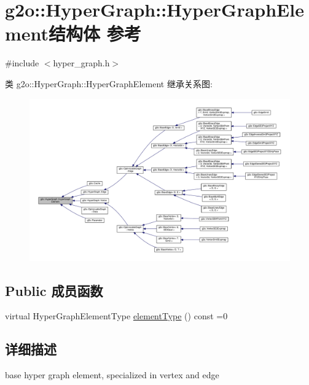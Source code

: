 \hypertarget{structg2o_1_1HyperGraph_1_1HyperGraphElement}{\section{g2o\-:\-:Hyper\-Graph\-:\-:Hyper\-Graph\-Element结构体 参考}
\label{structg2o_1_1HyperGraph_1_1HyperGraphElement}
}


{\ttfamily \#include $<$hyper\-\_\-graph.\-h$>$}



类 g2o\-:\-:Hyper\-Graph\-:\-:Hyper\-Graph\-Element 继承关系图\-:
\nopagebreak
\begin{figure}[H]
\begin{center}
\leavevmode
\includegraphics[width=350pt]{structg2o_1_1HyperGraph_1_1HyperGraphElement__inherit__graph}
\end{center}
\end{figure}
\subsection*{Public 成员函数}
\begin{DoxyCompactItemize}
\item 
virtual Hyper\-Graph\-Element\-Type \hyperlink{structg2o_1_1HyperGraph_1_1HyperGraphElement_a1a9d7b748698c09d202373e06e413ef2}{element\-Type} () const =0
\end{DoxyCompactItemize}


\subsection{详细描述}
base hyper graph element, specialized in vertex and edge 


